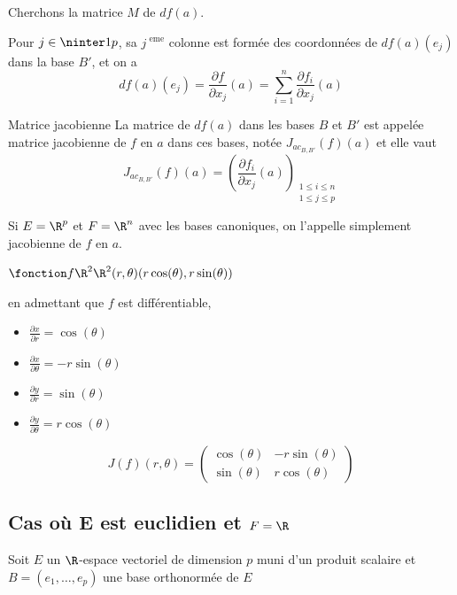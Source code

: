 Cherchons la matrice $M$ de $df(a)$. 

Pour $j \in \ninter  1 p$, sa $j^{\text{ eme}}$ colonne est formée des coordonnées 
de $df(a)(e_j)$ dans la base $B'$, et on a 
$$df(a)(e_j) = \frac{\partial f}{\partial x_j} (a) = \sum_{i = 1 }^{n } \frac{\partial f_i}{\partial x_j} (a)$$

\begin{definition}{Matrice jacobienne}{}
    La matrice de $df(a)$ dans les bases $B$ et $B'$ est appelée matrice jacobienne de
    $f$ en $a$ dans ces bases, notée $J_{ac_{B, B'}}(f)(a)$ et elle vaut 
    $$J_{ac_{B, B'}}(f)(a) = \left( \frac{\partial f_i}{\partial x_j} (a) \right)_{\substack{1 \leqslant i \leqslant n \\ 1 \leqslant j \leqslant p}}$$

    Si $E = \R^p$ et $F = \R^n$ avec les bases canoniques, on l'appelle simplement 
    jacobienne de $f$ en $a$. 
\end{definition}

\begin{exemple}
    $\fonction f {\R^2}{\R^2}{(r, \theta)}{(r \cos(\theta), r \sin (\theta))}$

    en admettant que $f$ est différentiable,
    \begin{itemize}
        \item $\frac{\partial x }{\partial r } = \cos(\theta)$
        \item $\frac{\partial x }{\partial \theta } = -r \sin(\theta)$
        \item $\frac{\partial y }{\partial r } = \sin(\theta)$
        \item $\frac{\partial y }{\partial \theta } = r \cos(\theta)$
    \end{itemize}

    $$ J(f)(r, \theta) = \begin{pmatrix}
        \cos(\theta) & -r \sin(\theta) \\
        \sin(\theta) & r \cos(\theta)
    \end{pmatrix}$$
\end{exemple}

\subsection{Cas où E est euclidien et \texorpdfstring{$F = \R$}{F = R}}

Soit $E$ un $\R$-espace vectoriel de dimension $p$ muni d'un produit scalaire et 
$B = (e_1, \ldots, e_p)$ une base orthonormée de $E$

